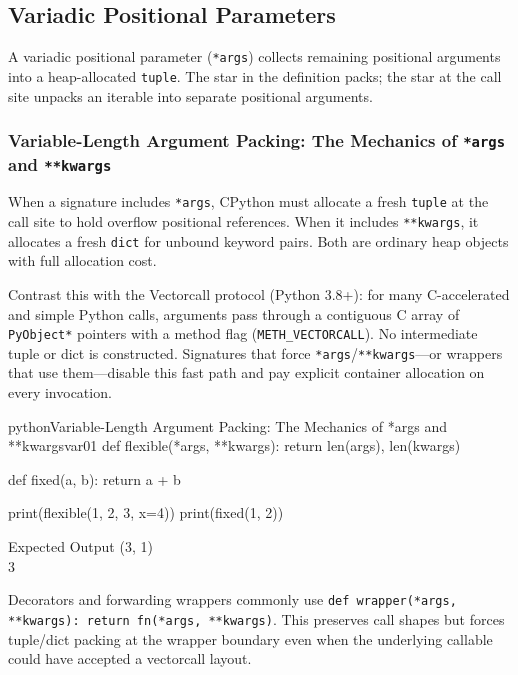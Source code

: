\subsection{Variadic Positional Parameters}

A variadic positional parameter (\texttt{*args}) collects remaining positional arguments into a heap-allocated \texttt{tuple}. The star in the definition packs; the star at the call site unpacks an iterable into separate positional arguments.

\subsubsection{Variable-Length Argument Packing: The Mechanics of \texttt{*args} and \texttt{**kwargs}}

When a signature includes \texttt{*args}, CPython must allocate a fresh \texttt{tuple} at the call site to hold overflow positional references. When it includes \texttt{**kwargs}, it allocates a fresh \texttt{dict} for unbound keyword pairs. Both are ordinary heap objects with full allocation cost.

Contrast this with the Vectorcall protocol (Python 3.8+): for many C-accelerated and simple Python calls, arguments pass through a contiguous C array of \texttt{PyObject*} pointers with a method flag (\texttt{METH\_VECTORCALL}). No intermediate tuple or dict is constructed. Signatures that force \texttt{*args}/\texttt{**kwargs}---or wrappers that use them---disable this fast path and pay explicit container allocation on every invocation.

\begin{codebox}[]{python}{Variable-Length Argument Packing: The Mechanics of *args and **kwargs}{var01}
def flexible(*args, **kwargs):
    return len(args), len(kwargs)

def fixed(a, b):
    return a + b

print(flexible(1, 2, 3, x=4))
print(fixed(1, 2))
\end{codebox}


\begin{iobox}{Expected Output}
(3, 1) \\
3 \\
\end{iobox}




Decorators and forwarding wrappers commonly use \texttt{def wrapper(*args, **kwargs): return fn(*args, **kwargs)}. This preserves call shapes but forces tuple/dict packing at the wrapper boundary even when the underlying callable could have accepted a vectorcall layout.

